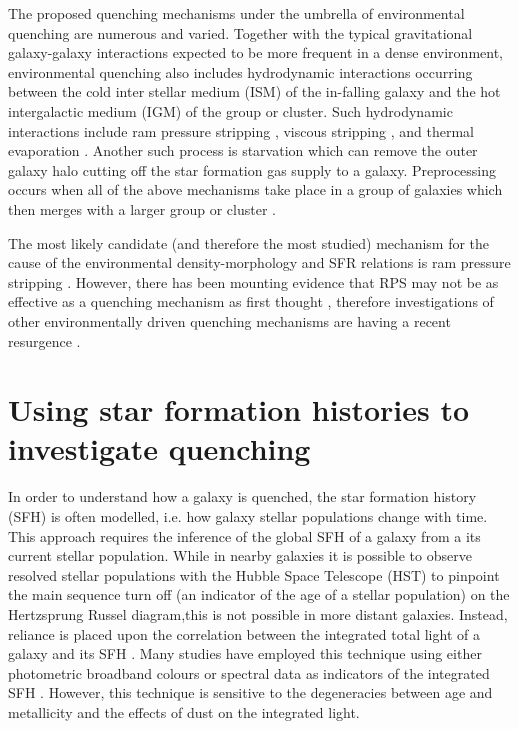 The proposed quenching mechanisms under the umbrella of environmental quenching are numerous and varied. Together with the typical gravitational galaxy-galaxy interactions \citep{moore96} expected to be more frequent in a dense environment, environmental quenching also includes hydrodynamic interactions occurring between the cold inter stellar medium (ISM) of the in-falling galaxy and the hot intergalactic medium (IGM) of the group or cluster. Such hydrodynamic interactions include ram pressure stripping \citep{gunngott72}, viscous stripping \citep{nulsen82}, and thermal evaporation \citep[a rapid rise in temperature of the ISM due to contact with the IGM;][]{cowie77}. Another such process is starvation \citep{larson80} which can remove the outer galaxy halo cutting off the star formation gas supply to a galaxy. Preprocessing occurs when all of the above mechanisms take place in a group of galaxies which then merges with a larger group or cluster \citep{dressler04}. 

The most likely candidate (and therefore the most studied) mechanism for the cause of the environmental density-morphology and SFR relations is ram pressure stripping \citep[RPS;][]{abadi99, poggianti99}. However, there has been mounting evidence that RPS may not be as effective as a quenching mechanism as first thought \citep{emerick16, fillingham16}, therefore investigations of other environmentally driven quenching mechanisms are having a recent resurgence \citep[e.g.][]{bialas15, peng15, smith15b, hahn16, maier16, paccagnella16, roberts16, vandevoort16}. 

\section{Using star formation histories to investigate quenching}\label{sec:invquench}


In order to understand how a galaxy is quenched, the star formation history (SFH) is often modelled, i.e. how galaxy stellar populations change with time. This approach requires the inference of the global SFH of a galaxy from a its current stellar population. While in nearby galaxies it is possible to observe resolved stellar populations with the Hubble Space Telescope (HST) to pinpoint the main sequence turn off (an indicator of the age of a stellar population) on the Hertzsprung Russel diagram,this is not possible in more distant galaxies. Instead, reliance is placed upon the correlation between the integrated total light of a galaxy and its SFH \citep{searle73}. Many studies have employed this technique using either photometric broadband colours or spectral data as indicators of the integrated SFH \citep[for example][]{deJong96, madau98, kauffmann03, dressler04, macarthur04, Martin07, perez11, sanchez11, mcdermid15}. However, this technique is sensitive to the degeneracies between age and metallicity \citep{worthey94} and the effects of dust \citep{ganda09, pastrav13} on the integrated light. 

